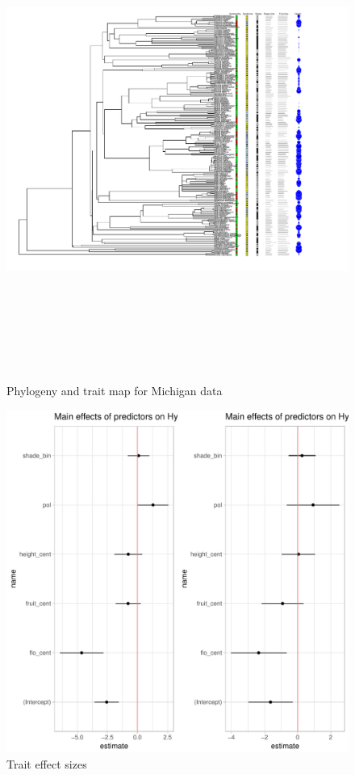 \documentclass{article}\usepackage[]{graphicx}\usepackage[]{color}
\makeatletter
\def\maxwidth{ %
  \ifdim\Gin@nat@width>\linewidth
    \linewidth
  \else
    \Gin@nat@width
  \fi
}
\newenvironment{knitrout}{}{} %
\makeatother
\begin{document}
\begin{figure}[h!]
\includegraphics[width=21cm, height=15cm]{tree_full_mich.pdf}\\
\caption{Phylogeny and trait map for Michigan data}
\end{figure}

\begin{figure}[h!]
\begin{knitrout}
\color{fgcolor}
\includegraphics[width=\maxwidth]{figure/unnamed-chunk-5-1} 

\end{knitrout}
\caption{Trait effect sizes}
\end{figure}
\end{document}
